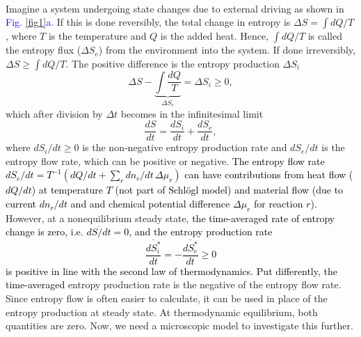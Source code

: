 \documentclass[aps,prl,reprint,singlecolumn,superscriptaddress]{revtex4}
\begin{document}
\\
Imagine a system undergoing state changes due to external driving as shown in \textcolor{blue}{Fig. \ref{fig1}a}. 
If this is done reversibly, the total change in entropy is $\Delta S=\int dQ/T$, where $T$ is the temperature and $Q$ is the added heat. Hence, 
$\int dQ/T$ is called the entropy flux ($\Delta S_e$) from the environment into the system. If done irreversibly, $\Delta S\geq\int dQ/T$. The
positive difference is the entropy production $\Delta S_i$ \cite{landi13}
\begin{equation}
\Delta S - \underbrace{\int\frac{dQ}{T}}_{\Delta S_e}=\Delta S_i\geq 0,
\end{equation}
which after division by $\Delta t$ becomes in the infinitesimal limit
\begin{equation}
\frac{dS}{dt}=\frac{dS_i}{dt}+\frac{dS_e}{dt},
\end{equation}
where $dS_i/dt\geq 0$ is the non-negative entropy production rate and $dS_e/dt$ is the entropy flow rate, which 
can be positive or negative. \textcolor{black}{The entropy flow rate $dS_e/dt=T^{-1}(dQ/dt+\sum_{r}dn_r/dt\,\Delta\mu_r)$ can have contributions 
from heat flow ($dQ/dt$) at temperature $T$ (not part of Schl\"ogl model) and material flow (due to current $dn_r/dt$ and 
and chemical potential difference $\Delta\mu_r$ for reaction $r$).}
However, at a nonequilibrium steady state, \textcolor{black}{the time-averaged rate of entropy
change is zero, i.e. $\overline{dS/dt}=0$, and the entropy production rate
\begin{equation}
\overline{\frac{dS_i^*}{dt}}=-\overline{\frac{dS_e^*}{dt}}\geq 0\label{equal_dSdt}
\end{equation}
is positive in line with the second law of thermodynamics. Put differently, the time-averaged} entropy production rate is the 
negative of the entropy flow rate. Since entropy flow is often easier to calculate, it can be used in place of the entropy production at steady state. 
At thermodynamic equilibrium, both quantities are zero. Now, we need a microscopic model to investigate this further.
\end{document}
